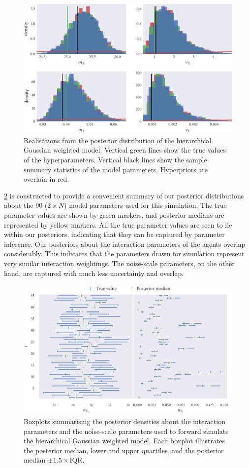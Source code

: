 \begin{figure}[tbp]
  \includegraphics{gauss_hier_hist.pdf}
  \caption{Realisations from the posterior distribution of the hierarchical
    Gaussian weighted model. Vertical green lines show the true values of the
    hyperparameters. Vertical black lines show the sample summary statistics
    of the model parameters. Hyperpriors are overlain in red.}
  \label{fig:gauss_hier_hist}
\end{figure}

\cref{fig:gauss_hier_summary} is constructed to provide a convenient summary of
our posterior distributions about the $90$ ($2\times N$) model parameters used
for this simulation. The true parameter values are shown by green markers, and
posterior medians are represented by yellow markers. All the true parameter
values are seen to lie within our posteriors, indicating that they can
be captured by parameter inference. Our posteriors about the interaction
parameters of the agents overlap considerably. This indicates that the
parameters drawn for simulation represent very similar interaction weightings.
The noise-scale parameters, on the other hand, are captured with much less
uncertainty and overlap.

\begin{figure}[tbp]
  \includegraphics{gauss_hier_summary.pdf}
  \caption{Boxplots summarising the posterior densities about the interaction
    parameters and the noise-scale parameters used to forward simulate the
    hierarchical Gaussian weighted model. Each boxplot illustrates the
    posterior median, lower and upper quartiles, and the posterior median
    $\pm1.5\times\text{IQR}$.}
  \label{fig:gauss_hier_summary}
\end{figure}

